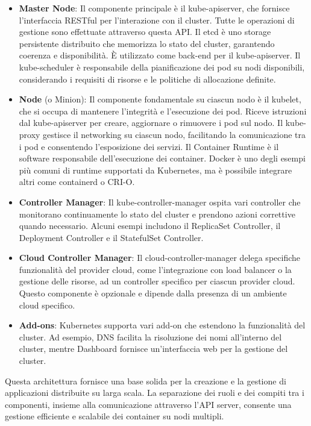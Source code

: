 \begin{itemize}
    \item \textbf{Master Node}:
    Il componente principale è il kube-apiserver, che fornisce l'interfaccia RESTful per l'interazione con il cluster. Tutte le operazioni di gestione sono effettuate attraverso questa API.
    Il etcd è uno storage persistente distribuito che memorizza lo stato del cluster, garantendo coerenza e disponibilità. È utilizzato come back-end per il kube-apiserver.
    Il kube-scheduler è responsabile della pianificazione dei pod su nodi disponibili, considerando i requisiti di risorse e le politiche di allocazione definite.

    \item \textbf{Node} (o Minion):
        Il componente fondamentale su ciascun nodo è il kubelet, che si occupa di mantenere l'integrità e l'esecuzione dei pod. Riceve istruzioni dal kube-apiserver per creare, aggiornare o rimuovere i pod sul nodo.
        Il kube-proxy gestisce il networking su ciascun nodo, facilitando la comunicazione tra i pod e consentendo l'esposizione dei servizi.
        Il Container Runtime è il software responsabile dell'esecuzione dei container. Docker è uno degli esempi più comuni di runtime supportati da Kubernetes, ma è possibile integrare altri come containerd o CRI-O.

    \item \textbf{Controller Manager}:
        Il kube-controller-manager ospita vari controller che monitorano continuamente lo stato del cluster e prendono azioni correttive quando necessario. Alcuni esempi includono il ReplicaSet Controller, il Deployment Controller e il StatefulSet Controller.

    \item \textbf{Cloud Controller Manager}:
        Il cloud-controller-manager delega specifiche funzionalità del provider cloud, come l'integrazione con load balancer o la gestione delle risorse, ad un controller specifico per ciascun provider cloud. Questo componente è opzionale e dipende dalla presenza di un ambiente cloud specifico.

    \item \textbf{Add-ons}:
        Kubernetes supporta vari add-on che estendono la funzionalità del cluster. Ad esempio, DNS facilita la risoluzione dei nomi all'interno del cluster, mentre Dashboard fornisce un'interfaccia web per la gestione del cluster.
\end{itemize}

Questa architettura fornisce una base solida per la creazione e la gestione di applicazioni distribuite su larga scala. La separazione dei ruoli e dei compiti tra i componenti, insieme alla comunicazione attraverso l'API server, consente una gestione efficiente e scalabile dei container su nodi multipli.

